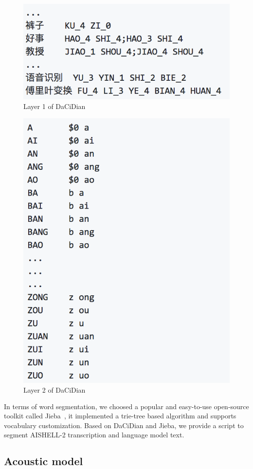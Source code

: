 \documentclass[a4paper]{article}
\begin{document}
\begin{figure}[t]
  \centering
  \includegraphics[width=0.8\linewidth]{dacidianl1.png}
  \caption{Layer 1 of DaCiDian}
  \label{fig:lex1}
\end{figure}
\begin{figure}[t]
  \centering
  \includegraphics[width=0.8\linewidth]{dacidianl2.png}
  \caption{Layer 2 of DaCiDian}
  \label{fig:lex2}
\end{figure}

In terms of word segmentation, we choosed a popular and easy-to-use open-source
toolkit called Jieba~\cite{jieba}, it implemented a trie-tree based algorithm and
supports vocabulary customization. Based on DaCiDian and Jieba, we provide a
script to segment AISHELL-2 transcription and language model text.

\subsection{Acoustic model}
\end{document}
